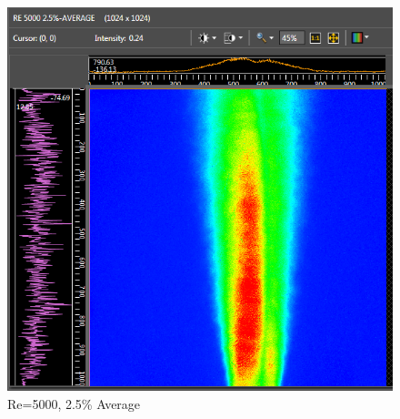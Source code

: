 \documentclass[preview,12pt]{article}
\begin{document}
\begin{figure}[h]
    \centering
    \includegraphics[width=0.55\linewidth]{RE-5000-25-Avg.PNG}
    \caption{{\footnotesize Re=5000, 2.5\% Average}}
\end{figure}
\end{document}
